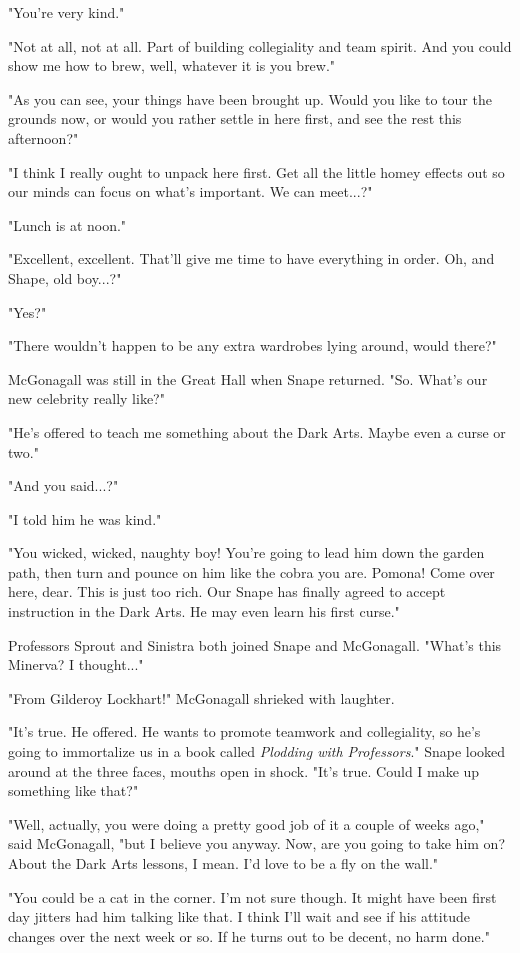 \documentclass[a4paper,11pt]{article}
\begin{document}
"You're very kind."

"Not at all, not at all. Part of building collegiality and team spirit. And you could show me how to brew, well, whatever it is you brew."

"As you can see, your things have been brought up. Would you like to tour the grounds now, or would you rather settle in here first, and see the rest this afternoon?"

"I think I really ought to unpack here first. Get all the little homey effects out so our minds can focus on what's important. We can meet...?"

"Lunch is at noon."

"Excellent, excellent. That'll give me time to have everything in order. Oh, and Shape, old boy...?"

"Yes?"

"There wouldn't happen to be any extra wardrobes lying around, would there?"

McGonagall was still in the Great Hall when Snape returned. "So. What's our new celebrity really like?"

"He's offered to teach me something about the Dark Arts. Maybe even a curse or two."

"And you said...?"

"I told him he was kind."

"You wicked, wicked, naughty boy! You're going to lead him down the garden path, then turn and pounce on him like the cobra you are. Pomona! Come over here, dear. This is just too rich. Our Snape has finally agreed to accept instruction in the Dark Arts. He may even learn his first curse."

Professors Sprout and Sinistra both joined Snape and McGonagall. "What's this Minerva? I thought..."

"From Gilderoy Lockhart!" McGonagall shrieked with laughter.

"It's true. He offered. He wants to promote teamwork and collegiality, so he's going to immortalize us in a book called \emph{Plodding with Professors}." Snape looked around at the three faces, mouths open in shock. "It's true. Could I make up something like that?"

"Well, actually, you were doing a pretty good job of it a couple of weeks ago," said McGonagall, "but I believe you anyway. Now, are you going to take him on? About the Dark Arts lessons, I mean. I'd love to be a fly on the wall."

"You could be a cat in the corner. I'm not sure though. It might have been first day jitters had him talking like that. I think I'll wait and see if his attitude changes over the next week or so. If he turns out to be decent, no harm done."
\end{document}
